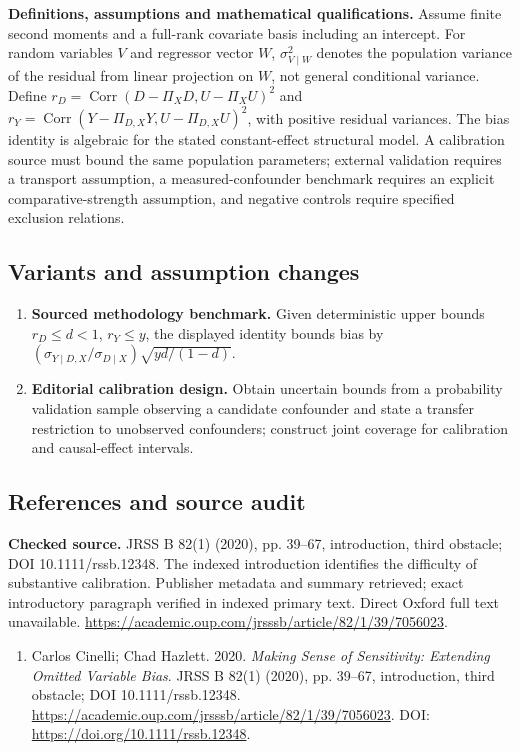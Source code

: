 \documentclass[11pt,a4paper]{article}
\begin{document}
\textbf{Definitions, assumptions and mathematical qualifications.} Assume finite second moments and a full-rank covariate basis including an intercept. For random variables \(V\) and regressor vector \(W\), \(\sigma_{V\mid W}^2\) denotes the population variance of the residual from linear projection on \(W\), not general conditional variance. Define \(r_D=\operatorname{Corr}(D-\Pi_XD,U-\Pi_XU)^2\) and \(r_Y=\operatorname{Corr}(Y-\Pi_{D,X}Y,U-\Pi_{D,X}U)^2\), with positive residual variances. The bias identity is algebraic for the stated constant-effect structural model. A calibration source must bound the same population parameters; external validation requires a transport assumption, a measured-confounder benchmark requires an explicit comparative-strength assumption, and negative controls require specified exclusion relations.
\subsection*{Variants and assumption changes}
\begin{enumerate}
\item \textbf{Sourced methodology benchmark.} Given deterministic upper bounds \(r_D\leq d<1\), \(r_Y\leq y\), the displayed identity bounds bias by \((\sigma_{Y\mid D,X}/\sigma_{D\mid X})\sqrt{yd/(1-d)}\).
\item \textbf{Editorial calibration design.} Obtain uncertain bounds from a probability validation sample observing a candidate confounder and state a transfer restriction to unobserved confounders; construct joint coverage for calibration and causal-effect intervals.
\end{enumerate}
\subsection*{References and source audit}
\textbf{Checked source.} JRSS B 82(1) (2020), pp. 39--67, introduction, third obstacle; DOI 10.1111/rssb.12348. The indexed introduction identifies the difficulty of substantive calibration. Publisher metadata and summary retrieved; exact introductory paragraph verified in indexed primary text. Direct Oxford full text unavailable. \url{https://academic.oup.com/jrsssb/article/82/1/39/7056023}.
\begin{enumerate}\raggedright
\item\hypertarget{definitions:source:30007704:1}{} Carlos Cinelli; Chad Hazlett. 2020. \emph{Making Sense of Sensitivity: Extending Omitted Variable Bias}. JRSS B 82(1) (2020), pp. 39--67, introduction, third obstacle; DOI 10.1111/rssb.12348.
\url{https://academic.oup.com/jrsssb/article/82/1/39/7056023}.
DOI: \url{https://doi.org/10.1111/rssb.12348}.
\end{enumerate}
\end{document}
